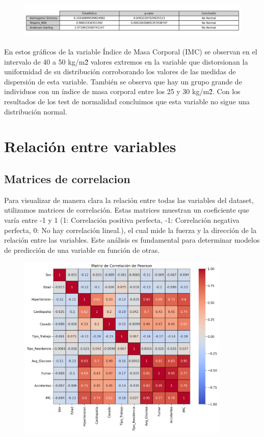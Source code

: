 \documentclass[a4paper, 12pt]{article}
\begin{document}
\begin{figure}[H]
    \centering
    \includegraphics[width=1\textwidth]{img/Tablas/test_normalidad_IMC.png}
\end{figure}


En estos gráficos de la variable Índice de Masa Corporal (IMC) se observan en el intervalo de 40 a 50 kg/m\^2 valores extremos en 
la variable que distorsionan la uniformidad de su distribución corroborando los valores de las medidas de dispersión de esta variable. 
También se observa que hay un grupo grande de individuos con un índice de masa corporal entre los 25 y 30 kg/m\^2. Con los resultados 
de los test de normalidad concluimos que esta variable no sigue una distribución normal.









\newpage


\section{Relación entre variables}

\subsection{Matrices de correlacion}
Para visualizar de manera clara la relación entre todas las variables del dataset, utilizamos matrices de correlación. Estas matrices muestran un coeficiente que varía entre -1 y 1 (1: Correlación positiva perfecta, -1: Correlación negativa perfecta, 0: No hay correlación lineal.), el cual mide la fuerza y la dirección de la relación entre las variables. Este análisis es fundamental para determinar modelos de predicción de una variable en función de otras.
\begin{figure}[h]
    \centering
    \includegraphics[width=0.9\textwidth]{img/matriz_correlacion_pearson.png}
\end{figure}
\end{document}
